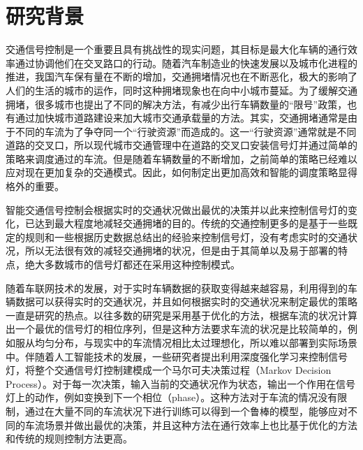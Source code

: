 
\chapter{研究背景}
交通信号控制是一个重要且具有挑战性的现实问题，其目标是最大化车辆的通行效率通过协调他们在交叉路口的行动。随着汽车制造业的快速发展以及城市化进程的推进，我国汽车保有量在不断的增加，交通拥堵情况也在不断恶化，极大的影响了人们的生活的城市的运作，同时这种拥堵现象也在向中小城市蔓延。为了缓解交通拥堵，很多城市也提出了不同的解决方法，有减少出行车辆数量的“限号”政策，也有通过加快城市道路建设来加大城市交通承载量的方法。其实，交通拥堵通常是由于不同的车流为了争夺同一个“行驶资源”而造成的。这一“行驶资源”通常就是不同道路的交叉口，所以现代城市交通管理中在道路的交叉口安装信号灯并通过简单的策略来调度通过的车流。但是随着车辆数量的不断增加，之前简单的策略已经难以应对现在更加复杂的交通模式。因此，如何制定出更加高效和智能的调度策略显得格外的重要。

智能交通信号控制会根据实时的交通状况做出最优的决策并以此来控制信号灯的变化，已达到最大程度地减轻交通拥堵的目的。传统的交通控制更多的是基于一些既定的规则和一些根据历史数据总结出的经验来控制信号灯，没有考虑实时的交通状况，所以无法很有效的减轻交通拥堵的状况，但是由于其简单以及易于部署的特点，绝大多数城市的信号灯都还在采用这种控制模式。

随着车联网技术的发展，对于实时车辆数据的获取变得越来越容易，利用得到的车辆数据可以获得实时的交通状况，并且如何根据实时的交通状况来制定最优的策略一直是研究的热点。以往多数的研究是采用基于优化的方法，根据车流的状况计算出一个最优的信号灯的相位序列，但是这种方法要求车流的状况是比较简单的，例如服从均匀分布，与现实中的车流情况相比太过理想化，所以难以部署到实际场景中。伴随着人工智能技术的发展，一些研究者提出利用深度强化学习来控制信号灯，将整个交通信号灯控制建模成一个马尔可夫决策过程（Markov Decision Process）。对于每一次决策，输入当前的交通状况作为状态，输出一个作用在信号灯上的动作，例如变换到下一个相位（phase）。这种方法对于车流的情况没有限制，通过在大量不同的车流状况下进行训练可以得到一个鲁棒的模型，能够应对不同的车流场景并做出最优的决策，并且这种方法在通行效率上也比基于优化的方法和传统的规则控制方法更高。


